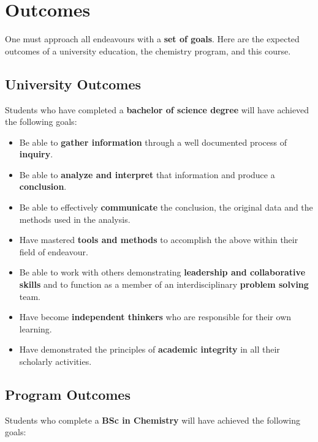 
\section{Outcomes}

One must approach all endeavours with a \textbf{set of goals}. Here are the expected outcomes of a university education, the chemistry program, and this course.

\subsection{University Outcomes}

Students who have completed a \textbf{bachelor of science degree} will have achieved the following goals:

\begin{itemize}
\item Be able to \textbf{gather information} through a well documented process of \textbf{inquiry}.
\item Be able to \textbf{analyze and interpret} that information and produce a \textbf{conclusion}.
\item Be able to effectively \textbf{communicate} the conclusion, the original data and the methods used in the analysis.
\item Have mastered \textbf{tools and methods} to accomplish the above within their field of endeavour.
\item Be able to work with others demonstrating \textbf{leadership and collaborative skills} and to function as a member of an interdisciplinary \textbf{problem solving} team.
\item Have become \textbf{independent thinkers} who are responsible for their own learning.
\item Have demonstrated the principles of \textbf{academic integrity} in all their scholarly activities.
\end{itemize}

\subsection{Program Outcomes}

Students who complete a \textbf{BSc in Chemistry} will have achieved the following goals:

